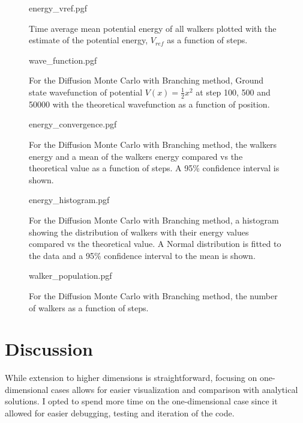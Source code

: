 \documentclass[reqno]{amsart}
\numberwithin{equation}{section}
\numberwithin{figure}{section}
\begin{document}
\begin{figure}[h]
    \centering
    {energy_vref.pgf}
    \caption{Time average mean potential energy of all walkers plotted with the estimate of the potential energy, $V_{ref}$ as a function of steps.}
    \label{fig:energy_vref}
\end{figure}

\begin{figure}[h]
    \centering
    {wave_function.pgf}
    \caption{For the Diffusion Monte Carlo with Branching method, Ground state wavefunction of potential $V(x) = \frac{1}{2}x^2$ at step 100, 500 and 50000 with the theoretical wavefunction as a function of position.}
    \label{fig:energy_vs_time}
\end{figure}

\begin{figure}[h]
    \centering
    {energy_convergence.pgf}
    \caption{For the Diffusion Monte Carlo with Branching method, the walkers energy and a mean of the walkers energy compared vs the theoretical value as a function of steps. A 95\% confidence interval is shown.}
    \label{fig:energy_convergence}
\end{figure}

\begin{figure}[h]
    \centering
    {energy_histogram.pgf}
    \caption{For the Diffusion Monte Carlo with Branching method, a histogram showing the distribution of walkers with their energy values compared vs the theoretical value. A Normal distribution is fitted to the data and a 95\% confidence interval to the mean is shown.}
    \label{fig:energy_histogram}
\end{figure}

\begin{figure}[h]
    \centering
    {walker_population.pgf}
    \caption{For the Diffusion Monte Carlo with Branching method, the number of walkers as a function of steps.}
    \label{fig:walker_population}
\end{figure}

\section{Discussion}
While extension to higher dimensions is straightforward, focusing on one-dimensional cases allows for easier visualization and comparison with analytical solutions. I opted to spend more time on the one-dimensional case since it allowed for easier debugging, testing and iteration of the code. \\
\end{document}
